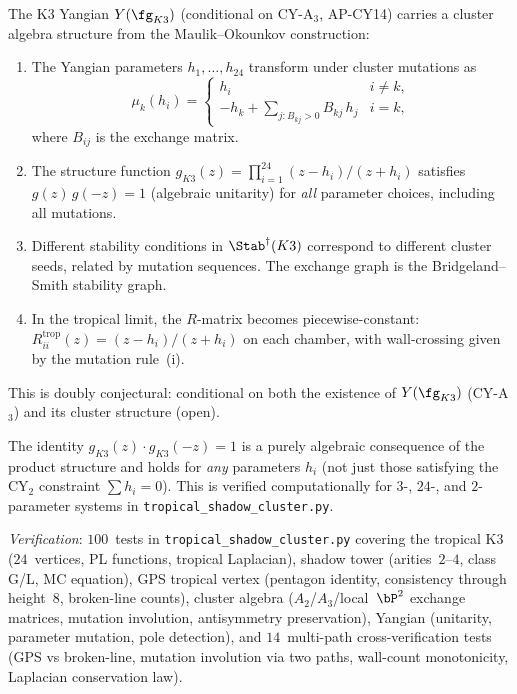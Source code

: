 \begin{conjecture}
\label{conj:cluster-yangian}
\ClaimStatusConjectured
The K3 Yangian $Y(\fg_{K3})$ \textup{(}conditional on CY-A$_3$, AP-CY14\textup{)} carries a cluster algebra structure from the Maulik--Okounkov construction:
\begin{enumerate}[label=\textup{(\roman*)}]
\item The Yangian parameters $h_1, \ldots, h_{24}$ transform under cluster mutations as
\[
  \mu_k(h_i) = \begin{cases} h_i & i \neq k, \\ -h_k + \displaystyle\sum_{j \colon B_{kj} > 0} B_{kj}\,h_j & i = k, \end{cases}
\]
where $B_{ij}$ is the exchange matrix.
\item The structure function $g_{K3}(z) = \prod_{i=1}^{24}(z - h_i)/(z + h_i)$ satisfies $g(z)\,g(-z) = 1$ \textup{(}algebraic unitarity\textup{)} for \emph{all} parameter choices, including all mutations.
\item Different stability conditions in $\Stab^\dagger(K3)$ correspond to different cluster seeds, related by mutation sequences.  The exchange graph is the Bridgeland--Smith stability graph.
\item In the tropical limit, the $R$-matrix becomes piecewise-constant: $R^{\mathrm{trop}}_{ii}(z) = (z - h_i)/(z + h_i)$ on each chamber, with wall-crossing given by the mutation rule~\textup{(i)}.
\end{enumerate}
This is doubly conjectural: conditional on both the existence of $Y(\fg_{K3})$ \textup{(}CY-A$_3$\textup{)} and its cluster structure \textup{(}open\textup{)}.
\end{conjecture}

\begin{remark}
\label{rem:tropical-unitarity}
The identity $g_{K3}(z) \cdot g_{K3}(-z) = 1$ is a purely algebraic consequence of the product structure and holds for \emph{any} parameters $h_i$ (not just those satisfying the CY$_2$ constraint $\sum h_i = 0$).  This is verified computationally for $3$-, $24$-, and $2$-parameter systems in \texttt{tropical\_shadow\_cluster.py}.
\end{remark}

\noindent\textit{Verification}: $100$~tests in \texttt{tropical\_shadow\_cluster.py} covering the tropical K3 ($24$~vertices, PL functions, tropical Laplacian), shadow tower (arities~$2$--$4$, class G/L, MC equation), GPS tropical vertex (pentagon identity, consistency through height~$8$, broken-line counts), cluster algebra ($A_2$/$A_3$/local~$\bP^2$ exchange matrices, mutation involution, antisymmetry preservation), Yangian (unitarity, parameter mutation, pole detection), and $14$~multi-path cross-verification tests (GPS vs broken-line, mutation involution via two paths, wall-count monotonicity, Laplacian conservation law).


